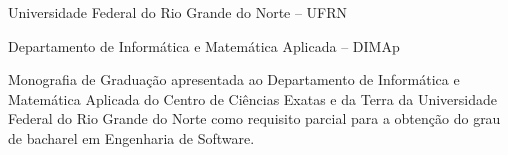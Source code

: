 
\instituicao
{
	Universidade Federal do Rio Grande do Norte -- UFRN \par
	Departamento de Informática e Matemática Aplicada -- DIMAp
}

\comentario
{
	Monografia de Graduação apresentada ao Departamento de Informática e Matemática Aplicada do
	Centro de Ciências Exatas e da Terra da Universidade Federal do Rio Grande do Norte como
	requisito parcial para a obtenção do grau de bacharel em Engenharia de Software.
}


\folhaderosto
